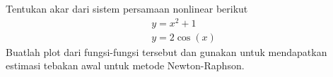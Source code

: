 \begin{soal}
Tentukan akar dari sistem persamaan nonlinear berikut
\begin{align*}
y = x^2 + 1 \\
y = 2\cos(x)
\end{align*}
Buatlah plot dari fungsi-fungsi tersebut dan gunakan untuk mendapatkan estimasi tebakan
awal untuk metode Newton-Raphson.
\end{soal}